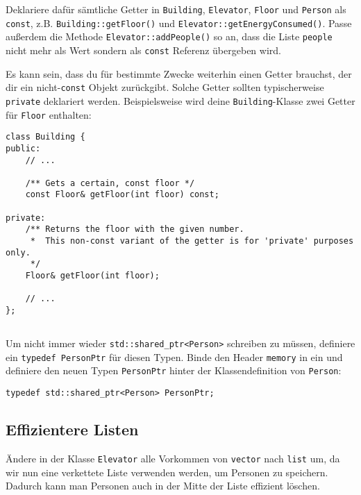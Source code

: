 Deklariere dafür sämtliche Getter in \lstinline{Building}, \lstinline{Elevator}, \lstinline{Floor} und \lstinline{Person} als \lstinline{const}, z.B. \lstinline{Building::getFloor()} und \lstinline{Elevator::getEnergyConsumed()}.
Passe außerdem die Methode \lstinline{Elevator::addPeople()} so an, dass die Liste \lstinline{people} nicht mehr als Wert sondern als \lstinline{const} Referenz übergeben wird.

Es kann sein, dass du für bestimmte Zwecke weiterhin einen Getter brauchst, der dir ein nicht-\lstinline{const} Objekt zurückgibt.
Solche Getter sollten typischerweise \lstinline{private} deklariert werden.
Beispielsweise wird deine \lstinline{Building}-Klasse zwei Getter für \lstinline{Floor} enthalten:
\begin{lstlisting}
class Building {
public:
    // ...

    /** Gets a certain, const floor */
    const Floor& getFloor(int floor) const;

private:
    /** Returns the floor with the given number. 
     *  This non-const variant of the getter is for 'private' purposes only. 
     */
    Floor& getFloor(int floor);

    // ...
};
\end{lstlisting}


\subsection{}
Um nicht immer wieder \lstinline{std::shared_ptr<Person>} schreiben zu müssen, definiere ein \lstinline{typedef PersonPtr} für diesen Typen.
Binde den Header \lstinline{memory} in  ein und definiere den neuen Typen \lstinline{PersonPtr} hinter der Klassendefinition von \lstinline{Person}:

\begin{lstlisting}
typedef std::shared_ptr<Person> PersonPtr;
\end{lstlisting}

\subsection{Effizientere Listen}
Ändere in der Klasse \lstinline{Elevator} alle Vorkommen von \lstinline{vector} nach \lstinline{list} um, da wir nun eine verkettete Liste verwenden werden, um Personen zu speichern.
Dadurch kann man Personen auch in der Mitte der Liste effizient löschen.

